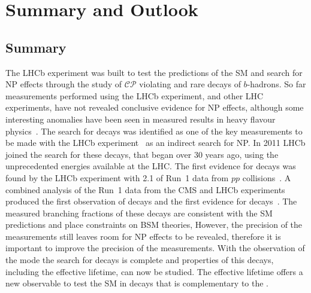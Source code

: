 \chapter{{\bf Summary and Outlook}}
\label{sec:summaryandoutlook}

\section{Summary}
The LHCb experiment was built to test the predictions of the SM and search for NP effects through the study of $\mathcal{CP}$ violating and rare decays of $b$-hadrons. So far measurements performed using the LHCb experiment, and other LHC experiments, have not revealed conclusive evidence for NP effects, although some interesting anomalies have been seen in measured results in heavy flavour physics~\cite{PhysRevLett.118.111801,Aaij:2014pli, Aaij:2015oid. ATLAS-CONF-2017-023,CMS-PAS-BPH-15-008,Aaij:2015esa,PhysRevLett.113.151601,R_K_star,Aaij:2015yra,Huschle:2015rga, Lees:2012xj,Lees:2013uzd, Sato:2016svk,Altmannshofer:2017yso,Capdevila:2017bsm,Amhis:2016xyh}. 
The search for \bmumu decays was identified as one of the key measurements to be made with the LHCb experiment~\cite{Adeva:2009ny} as an indirect search for NP.
In 2011 LHCb joined the search for these decays, that began over 30 years ago, using the unprecedented energies available at the LHC. The first evidence for \bsmumu decays was found by the LHCb experiment with 2.1 \fb of Run~1 data from $pp$ collisions~\cite{Aaij:2012nna}. A combined analysis of the Run~1 data from the CMS and LHCb experiments produced the first observation of \bsmumu decays and the first evidence for \bdmumu decays~\cite{CMS:2014xfa}. The measured branching fractions of these decays are consistent with the SM predictions and place constraints on BSM theories, However, the precision of the measurements still leaves room for NP effects to be revealed, therefore it is important to improve the precision of the \BF measurements. With the observation of the \bs mode the search for \bsmumu decays is complete and properties of this decays, including the effective lifetime, can now be studied. The effective lifetime offers a new observable to test the SM in \bsmumu decays that is complementary to the \BF. 

